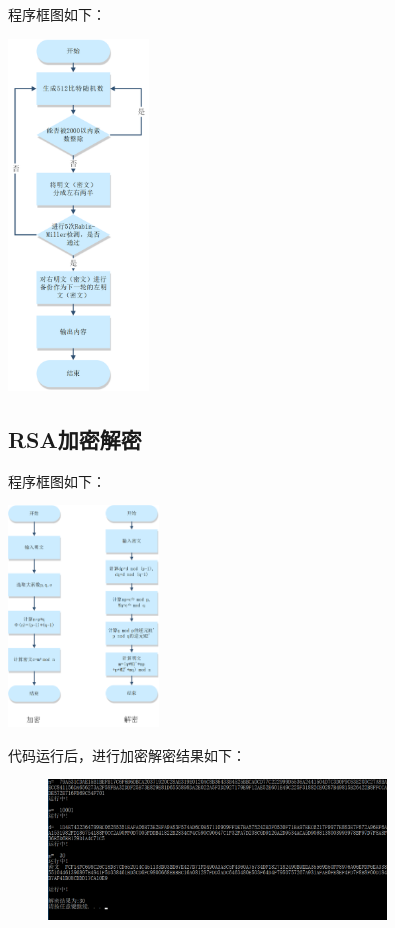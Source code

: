 \documentclass[UTF8,a4paper]{article}
\begin{document}
程序框图如下：\par 

	\begin{center}
	
	\includegraphics[width=0.28\textwidth]{shengcheng.PNG}

\end{center}


\subsection{RSA加密解密}	
程序框图如下：\par 
	\begin{center}
	
	\includegraphics[width=0.3\textwidth]{ende.PNG}
	
\end{center}

代码运行后，进行加密解密结果如下：\par 
	
	\begin{figure}[!ht]
		
		\centering
		\includegraphics[width=0.8\textwidth]{myen.PNG}
		
		\label{fig:grade}
	\end{figure}
\end{document}
